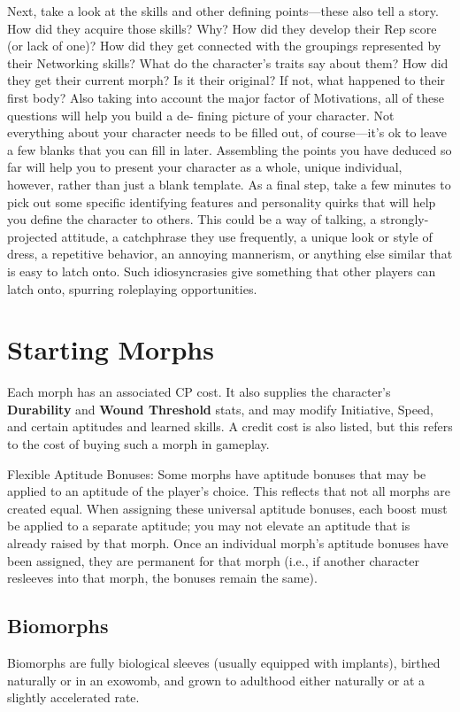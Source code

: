 Next, take a look at the skills and other defining points—these also tell a
story. How did they acquire those skills? Why? How did they develop their Rep
score (or lack of one)? How did they get connected with the groupings
represented by their Networking skills? What do the character’s traits say
about them?  How did they get their current morph? Is it their original? If
not, what happened to their first body?  Also taking into account the major
factor of Motivations, all of these questions will help you build a de-
fining picture of your character. Not everything about your character needs to
be filled out, of course—it’s ok to leave a few blanks that you can fill in
later. Assembling the points you have deduced so far will help you to present
your character as a whole, unique individual, however, rather than just a
blank template.  As a final step, take a few minutes to pick out some specific
identifying features and personality quirks that will help you define the
character to others. This could be a way of talking, a strongly-projected
attitude, a catchphrase they use frequently, a unique look or style of dress, a
repetitive behavior, an annoying mannerism, or anything else similar that is
easy to latch onto.  Such idiosyncrasies give something that other players can
latch onto, spurring roleplaying opportunities.

\section{Starting Morphs}
Each morph has an associated CP cost. It also supplies the character’s
\textbf{Durability} and \textbf{Wound Threshold} stats, and may modify
Initiative, Speed, and certain aptitudes and learned skills. A credit cost is
also listed, but this refers to the cost of buying such a morph in gameplay.

Flexible Aptitude Bonuses: Some morphs have aptitude bonuses that may be
applied to an aptitude of the player’s choice. This reflects that not all
morphs are created equal. When assigning these universal aptitude bonuses, each
boost must be applied to a separate aptitude; you may not elevate an aptitude
that is already raised by that morph. Once an individual morph’s aptitude
bonuses have been assigned, they are permanent for that morph (i.e., if another
character resleeves into that morph, the bonuses remain the same).

\subsection{Biomorphs}
Biomorphs are fully biological sleeves (usually equipped with implants),
birthed naturally or in an exowomb, and grown to adulthood either naturally or
at a slightly accelerated rate.

